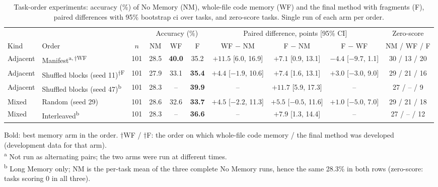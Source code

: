 \begin{table}[ht]
\centering
\caption{Task-order experiments: accuracy (\%) of No Memory (NM), whole-file code memory (WF) and the final method with fragments (F), paired differences with 95\% bootstrap \gls{ci} over tasks, and zero-score tasks. Single run of each arm per order.}
\label{tab:order}
\small
\setlength{\tabcolsep}{4pt}
\begin{adjustbox}{max width=\textwidth}
\begin{tabular}{llcccccccc}
\toprule
 & & & \multicolumn{3}{c}{Accuracy (\%)} & \multicolumn{3}{c}{Paired difference, points [95\% CI]} & Zero-score \\
\cmidrule(lr){4-6}\cmidrule(lr){7-9}
Kind & Order & $n$ & NM & WF & F & WF $-$ NM & F $-$ NM & F $-$ WF & NM / WF / F \\
\midrule
Adjacent & Manifest\textsuperscript{a,\,$\dagger$WF} & 101 & 28.5 & \textbf{40.0} & 35.2 & $+11.5$ [6.0, 16.9] & $+7.1$ [0.9, 13.1] & $-4.4$ [$-9.7$, 1.1] & 30 / 13 / 20 \\
Adjacent & Shuffled blocks (seed 11)\textsuperscript{$\dagger$F} & 101 & 27.9 & 33.1 & \textbf{35.4} & $+4.4$ [$-1.9$, 10.6] & $+7.4$ [1.6, 13.1] & $+3.0$ [$-3.0$, 9.0] & 29 / 21 / 16 \\
Adjacent & Shuffled blocks (seed 47)\textsuperscript{b} & 101 & 28.3 & -- & \textbf{39.9} & -- & $+11.7$ [5.9, 17.3] & -- & 27 / -- / 9 \\
Mixed & Random (seed 29) & 101 & 28.6 & 32.6 & \textbf{33.7} & $+4.5$ [$-2.2$, 11.3] & $+5.5$ [$-0.5$, 11.6] & $+1.0$ [$-5.0$, 7.0] & 29 / 21 / 18 \\
Mixed & Interleaved\textsuperscript{b} & 101 & 28.3 & -- & \textbf{36.6} & -- & $+7.9$ [1.3, 14.4] & -- & 27 / -- / 12 \\
\bottomrule
\end{tabular}
\end{adjustbox}

\smallskip\parbox{\linewidth}{\footnotesize Bold: best memory arm in the order. $\dagger$WF / $\dagger$F: the order on which whole-file code memory / the final method was developed (development data for that arm).\\ \textsuperscript{a} Not run as alternating pairs; the two arms were run at different times.\\ \textsuperscript{b} Long Memory only; NM is the per-task mean of the three complete No Memory runs, hence the same 28.3\% in both rows (zero-score: tasks scoring 0 in all three).}
\end{table}


